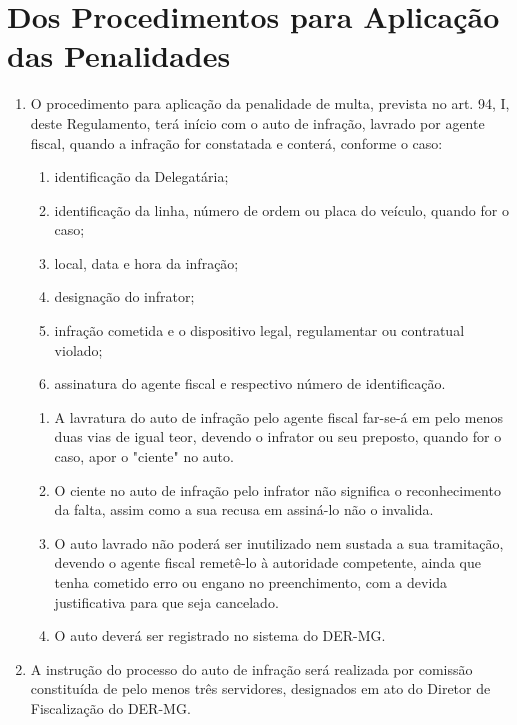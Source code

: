 \section{Dos Procedimentos para Aplicação das Penalidades}

\begin{enumerate}[resume, label=Art. \arabic*]

\item O procedimento para aplicação da penalidade de multa, prevista no art. 94, I, deste Regulamento, terá início com o auto de infração, lavrado por agente fiscal, quando a infração for constatada e conterá, conforme o caso:

\begin{enumerate}[label=\roman*.]

\item identificação da Delegatária;

\item identificação da linha, número de ordem ou placa do veículo, quando for o caso;

\item local, data e hora da infração;

\item designação do infrator;

\item infração cometida e o dispositivo legal, regulamentar ou contratual violado;

\item assinatura do agente fiscal e respectivo número de identificação.

\end{enumerate}

\begin{enumerate}[label= \S \arabic*] %

\item A lavratura do auto de infração pelo agente fiscal far-se-á em pelo menos duas vias de igual teor, devendo o infrator ou seu preposto, quando for o caso, apor o "ciente" no auto.

\item O ciente no auto de infração pelo infrator não significa o reconhecimento da falta, assim como a sua recusa em assiná-lo não o invalida.

\item O auto lavrado não poderá ser inutilizado nem sustada a sua tramitação, devendo o agente fiscal remetê-lo à autoridade competente, ainda que tenha cometido erro ou engano no preenchimento, com a devida justificativa para que seja cancelado.

\item O auto deverá ser registrado no sistema do DER-MG.

\end{enumerate}

\item A instrução do processo do auto de infração será realizada por comissão constituída de pelo menos três servidores, designados em ato do Diretor de Fiscalização do DER-MG.

\end{enumerate}